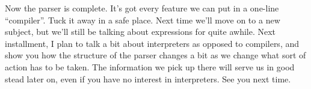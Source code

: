 Now the parser is complete. It's got every feature we can put in a  one-line ``compiler''.  Tuck it away in a safe place. Next time we'll move on to a new subject, but we'll still be  talking about expressions for quite awhile. Next installment, I plan to talk a bit about interpreters as opposed  to compilers, and show you how the structure of the parser changes a bit as we change  what sort of action has to be taken. The information we pick up there will serve  us in good stead later on, even if you have no interest in interpreters. See you next time.
